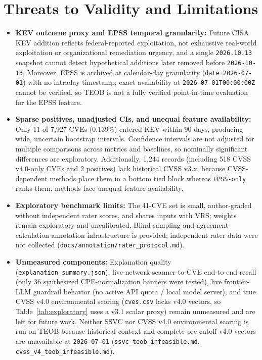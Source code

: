 \documentclass[conference]{IEEEtran}
\begin{document}
\section{Threats to Validity and Limitations}
\begin{itemize}
    \item \textbf{KEV outcome proxy and EPSS temporal granularity:} Future CISA KEV addition reflects federal-reported exploitation, not exhaustive real-world exploitation or organizational remediation urgency, and a single \texttt{2026.10.13} snapshot cannot detect hypothetical additions later removed before \texttt{2026-10-13}. Moreover, EPSS is archived at calendar-day granularity (\texttt{date=2026-07-01}) with no intraday timestamp; exact availability at \texttt{2026-07-01T00:00:00Z} cannot be verified, so TEOB is not a fully verified point-in-time evaluation for the EPSS feature.
    \item \textbf{Sparse positives, unadjusted CIs, and unequal feature availability:} Only 11 of 7,927 CVEs (0.139\%) entered KEV within 90 days, producing wide, uncertain bootstrap intervals. Confidence intervals are not adjusted for multiple comparisons across metrics and baselines, so nominally significant differences are exploratory. Additionally, 1,244 records (including 518 CVSS v4.0-only CVEs and 2 positives) lack historical CVSS v3.x; because CVSS-dependent methods place them in a bottom tied block whereas \texttt{EPSS-only} ranks them, methods face unequal feature availability.
    \item \textbf{Exploratory benchmark limits:} The 41-CVE set is small, author-graded without independent rater scores, and shares inputs with VRS; weights remain exploratory and uncalibrated. Blind-sampling and agreement-calculation annotation infrastructure is provided; independent rater data were not collected (\texttt{docs/annotation/rater\_protocol.md}).
    \item \textbf{Unmeasured components:} Explanation quality (\texttt{explanation\_summary.json}), live-network scanner-to-CVE end-to-end recall (only 36 synthesized CPE-normalization banners were tested), live frontier-LLM guardrail behavior (no active API quota / local model server), and true CVSS v4.0 environmental scoring (\texttt{cves.csv} lacks v4.0 vectors, so Table~\ref{tab:exploratory} uses a v3.1 scalar proxy) remain unmeasured and are left for future work. Neither SSVC nor CVSS v4.0 environmental scoring is run on TEOB because historical context and complete pre-cutoff v4.0 vectors are unavailable at \texttt{2026-07-01} (\texttt{ssvc\_teob\_infeasible.md}, \texttt{cvss\_v4\_teob\_infeasible.md}).
\end{itemize}
\end{document}
